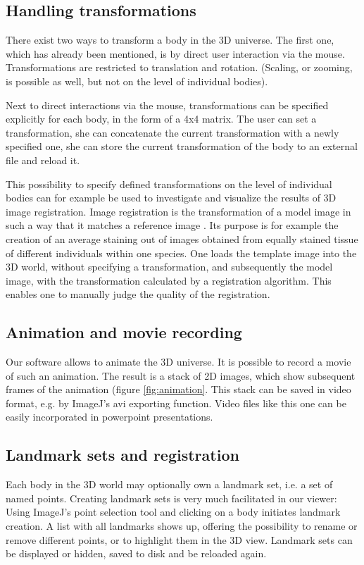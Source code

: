 \documentclass[a4paper,10pt]{article}
\begin{document}
\subsection{Handling transformations}
There exist two ways to transform a body in the 3D universe. The first one, which has already been mentioned, is by direct user interaction via the mouse. Transformations are restricted to translation and rotation. (Scaling, or zooming, is possible as well, but not on the level of individual bodies).

Next to direct interactions via the mouse, transformations can be specified explicitly for each body, in the form of a 4x4 matrix. The user can set a transformation, she can concatenate the current transformation with a newly specified one, she can store the current transformation of the body to an external file and reload it.

This possibility to specify defined transformations on the level of individual bodies can for example be used to investigate and visualize the results of 3D image registration. Image registration is the transformation of a model image in such a way that it matches a reference image \cite{jenett2006}. Its purpose is for example the creation of an average staining out of images obtained from equally stained tissue of different individuals within one species. One loads the template image into the 3D world, without specifying a transformation, and subsequently the model image, with the transformation calculated by a registration algorithm. This enables one to manually judge the quality of the registration.

\subsection{Animation and movie recording}
Our software allows to animate the 3D universe. It is possible to record a movie of such an animation. The result is a stack of 2D images, which show subsequent frames of the animation (figure \ref{fig:animation}. This stack can be saved in video format, e.g. by ImageJ's avi exporting function. Video files like this one can be easily incorporated in powerpoint presentations.

\subsection{Landmark sets and registration}
Each body in the 3D world may optionally own a landmark set, i.e. a set of named points. Creating landmark sets is very much facilitated in our viewer: Using ImageJ's point selection tool and clicking on a body initiates landmark creation. A list with all landmarks shows up, offering the possibility to rename or
remove different points, or to highlight them in the 3D view. Landmark sets can
be displayed or hidden, saved to disk and be reloaded again.
\end{document}
